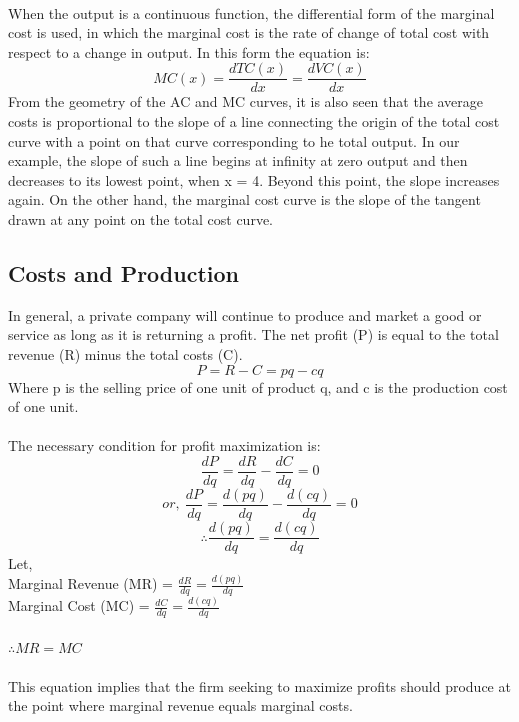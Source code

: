 \paragraph{}
When the output is a continuous function, the differential form of the marginal cost is used, in which the marginal cost is the rate of change of total cost with respect to a change in output. In this form the equation is:
\begin{equation}
	MC(x) = \frac{dTC(x)}{dx} = \frac{dVC(x)}{dx}
\end{equation}
From the geometry of the AC and MC curves, it is also seen that the average costs is proportional to the
slope of a line connecting the origin of the total cost curve with a point on that curve corresponding to he total output. In our example, the slope of such a line begins at infinity at zero output and then decreases to its lowest point, when x = 4. Beyond this point, the slope increases again. On the other hand, the marginal cost curve is the slope of the tangent drawn at any point on the total cost curve.
\subsection{Costs and Production}
In general, a private company will continue to produce and market a good or service as long as it is returning a profit. The net profit (P) is equal to the total revenue (R) minus the total costs (C).
\begin{equation}
	P = R - C = pq -cq
\end{equation}
Where p is the selling price of one unit of product q, and c is the production cost of one unit.\\\\
The necessary condition for profit maximization is:
$$ \frac{dP}{dq} = \frac{dR}{dq} - \frac{dC}{dq} = 0$$
$$or, \: \frac{dP}{dq} = \frac{d(pq)}{dq} - \frac{d(cq)}{dq} = 0$$
$$ \therefore \frac{d(pq)}{dq} = \frac{d(cq)}{dq}$$
Let,\\
Marginal Revenue (MR) = $\frac{dR}{dq} = \frac{d(pq)}{dq}$\\
Marginal Cost (MC) = $ \frac{dC}{dq} = \frac{d(cq)}{dq}$\\\\
$\therefore MR = MC$\\\\
This equation implies that the firm seeking to maximize profits should produce at the point where marginal revenue equals marginal costs.
